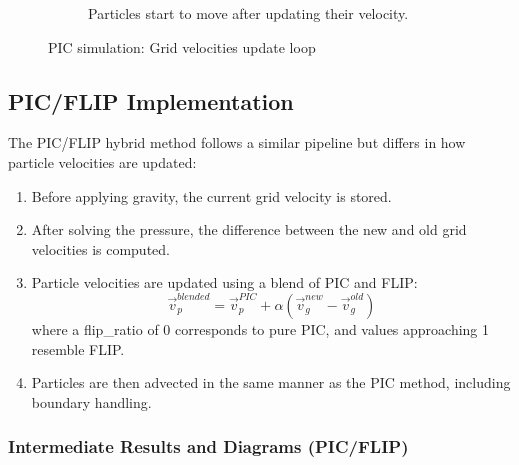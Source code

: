 \begin{figure}[h]
\begin{subfigure}[t]{0.2\textwidth}
    \caption{Particles start to move after updating their velocity.}
  \end{subfigure}
  \caption{PIC simulation: Grid velocities update loop}
  \label{fig:pic}
\end{figure}

\subsection{PIC/FLIP Implementation}

The PIC/FLIP hybrid method follows a similar pipeline but differs in how particle velocities are updated:

\begin{enumerate}
\item Before applying gravity, the current grid velocity is stored.

\item After solving the pressure, the difference between the new and old grid velocities is computed.

\item Particle velocities are updated using a blend of PIC and FLIP:
\begin{equation}
  \vec{v}_p^{blended} = \vec{v}_p^{PIC} + \alpha(\vec{v}_g^{new} - \vec{v}_g^{old})
\end{equation}
where a flip\_ratio of 0 corresponds to pure PIC, and values approaching 1 resemble FLIP.

\item Particles are then advected in the same manner as the PIC method, including boundary handling.
\end{enumerate}

\subsubsection{Intermediate Results and Diagrams (PIC/FLIP)}

